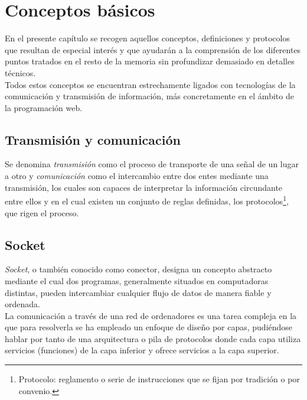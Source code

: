 


\chapter{Conceptos básicos}
\label{chap:conceptos-básicos}


En el presente capítulo se recogen aquellos conceptos, definiciones y protocolos que resultan de especial interés y que ayudarán a la comprensión de los diferentes puntos tratados en el resto de 
la memoria sin profundizar demasiado en detalles técnicos.\\

Todos estos conceptos se encuentran estrechamente ligados con tecnologías de la comunicación y transmisión de información, más concretamente en el ámbito de la programación web.

\section{Transmisión y comunicación}
\label{sec:transmisión}

Se denomina \emph{transmisión} como el proceso de transporte de una señal de un lugar a otro y \emph{comunicación} como el intercambio entre dos entes mediante una transmisión, los cuales son capaces de
interpretar la información circundante entre ellos y en el cual existen un conjunto de reglas definidas, los protocolos\footnote{Protocolo: reglamento o serie de instrucciones que se fijan por tradición o por convenio. },
que rigen el proceso.


\section{Socket}
\label{sec:def-socket}

\emph{Socket}, o también conocido como conector, designa un concepto abstracto mediante el cual dos programas, generalmente situados en computadoras distintas, pueden intercambiar cualquier flujo de datos
de manera fiable y ordenada.\\

La comunicación a través de una red de ordenadores es una tarea compleja en la que para resolverla se ha empleado un enfoque de diseño por capas, pudiéndose hablar por tanto de una arquitectura 
o pila de protocolos donde cada capa utiliza servicios (funciones) de la capa inferior y ofrece servicios a la capa superior. \\


